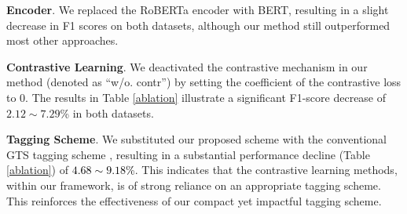 \documentclass[11pt]{article}
\begin{document}
\noindent\textbf{Encoder}. We replaced the RoBERTa encoder with BERT, resulting in a slight decrease in F1 scores on both datasets, although our method still outperformed most other approaches.

\noindent\textbf{Contrastive Learning}. We deactivated the contrastive mechanism in our method (denoted as ``w/o. contr'') by setting the coefficient of the contrastive loss to 0. The results in Table \ref{ablation} illustrate a significant F1-score decrease of $2.12\sim 7.29$\% in both datasets. 


\noindent\textbf{Tagging Scheme}. We substituted our proposed scheme with the conventional GTS tagging scheme \cite{wu2020grid}, resulting in a substantial performance decline (Table \ref{ablation}) of \textcolor{black}{$4.68\sim9.18$\%}. 
This indicates that the contrastive learning methods, within our framework, is of strong reliance on an appropriate tagging scheme. This reinforces the effectiveness of our compact yet impactful tagging scheme.
\end{document}
